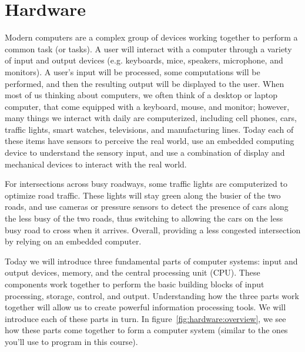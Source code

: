 \chapter{Hardware}

Modern computers are a complex group of devices working together
to perform a common task (or tasks). A user will interact with a
computer through a variety of input and output devices (e.g.
keyboards, mice, speakers, microphone, and monitors). A user's
input will be processed, some computations will be performed, and
then the resulting output will be displayed to the user. When most
of us thinking about computers, we often think of a desktop or laptop
computer, that come equipped with a keyboard, mouse, and monitor;
however, many things we interact with daily are computerized,
including cell phones, cars, traffic lights, smart watches,
televisions, and manufacturing lines. Today each of these items
have sensors to perceive the real world, use an embedded computing
device to understand the sensory input, and use a combination of
display and mechanical devices to interact with the real world.

\begin{example}
For intersections across busy roadways, some traffic lights are
computerized to optimize road traffic. These lights will stay
green along the busier of the two roads, and use cameras or
pressure sensors to detect the presence of cars along the less
busy of the two roads, thus switching to allowing the cars on
the less busy road to cross when it arrives. Overall, providing
a less congested intersection by relying on an embedded computer.
\end{example}

Today we will introduce three fundamental parts of computer systems:
input and output devices, memory, and the central processing unit (CPU).
These components work together to perform the basic building blocks of
input processing, storage, control, and output. Understanding how the
three parts work together will allow us to create powerful information
processing tools. We will introduce each of these parts in turn.
In figure~\ref{fig:hardware:overview}, we see how these parts come
together to form a computer system (similar to the ones you'll use
to program in this course).

